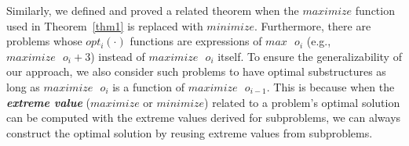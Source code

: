 \begin{comment}
\begin{proof}
For any $i\in[1, n]$, 
\begin{align}
    &\because o_{i-1}(\cdot) \le maximize \text{ }o_{i-1}(\cdot) \nonumber\\
    & \therefore h(o_{i-1}(\cdot), b[i])\le h(maximize \text{ }o_{i-1}(\cdot), b[i]) \nonumber\\
     &\therefore o_i(\cdot) \le h(maximize \text{ }o_{i-1}(\cdot), b[i])\nonumber\\ %
     &\therefore maximize\text{ }o_i(\cdot)=h(maximize \text{ }o_{i-1}(\cdot), b[i]), i.e.,  \nonumber \\
     & opt_i(\cdot)=h(opt_{i-1}(\cdot), b[i]) \nonumber
\end{align}
Therefore, $opt_i(\cdot)$ is a monotonic function of $opt_{i-1}(\cdot)$. The optimal solution can be composed with the optimal solution to a subproblem. \qedhere  
\end{proof}
\end{comment}
Similarly, we defined and proved a related theorem when the $maximize$ function used in Theorem~\ref{thm1} is replaced with $minimize$. Furthermore, there are problems whose $opt_i(\cdot)$ functions are expressions of $max\text{ }o_i$ (e.g., $maximize\text{ }o_i+3$) instead of $maximize\text{ }o_i$ itself. 
To ensure the generalizability of our approach, we also consider such problems 
to have optimal substructures as long as $maximize\text{ }o_i$ is a function of $maximize\text{ }o_{i-1}$. 
This is because when the \textbf{\emph{extreme value}} ($maximize$ or $minimize$) related to a problem's optimal solution can be computed 
with the extreme values derived for subproblems,
we can always construct the optimal solution by reusing extreme values from subproblems. 

